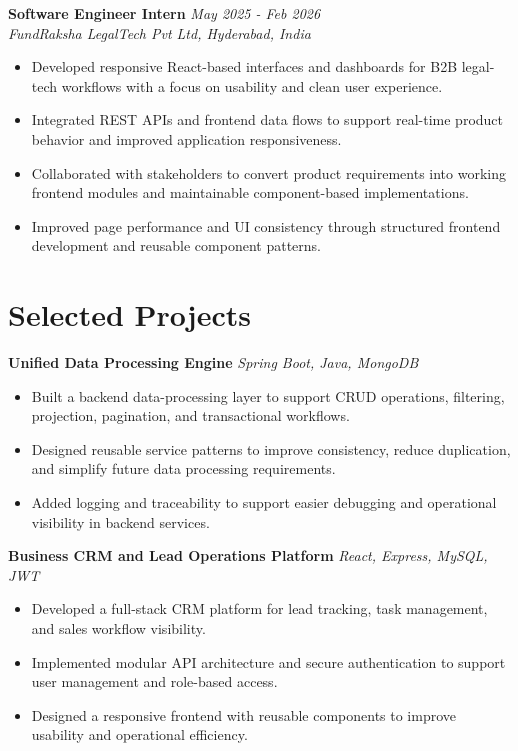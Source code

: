 \documentclass[10pt,a4paper]{article}
\begin{document}
\textbf{Software Engineer Intern} \hfill \textit{May 2025 - Feb 2026}\\
\textit{FundRaksha LegalTech Pvt Ltd, Hyderabad, India}\\
\begin{itemize}
  \item Developed responsive React-based interfaces and dashboards for B2B legal-tech workflows with a focus on usability and clean user experience.
  \item Integrated REST APIs and frontend data flows to support real-time product behavior and improved application responsiveness.
  \item Collaborated with stakeholders to convert product requirements into working frontend modules and maintainable component-based implementations.
  \item Improved page performance and UI consistency through structured frontend development and reusable component patterns.
\end{itemize}

\section*{\textcolor{accent}{Selected Projects}}

\textbf{Unified Data Processing Engine} \hfill \textit{Spring Boot, Java, MongoDB}\\
\begin{itemize}
  \item Built a backend data-processing layer to support CRUD operations, filtering, projection, pagination, and transactional workflows.
  \item Designed reusable service patterns to improve consistency, reduce duplication, and simplify future data processing requirements.
  \item Added logging and traceability to support easier debugging and operational visibility in backend services.
\end{itemize}

\textbf{Business CRM and Lead Operations Platform} \hfill \textit{React, Express, MySQL, JWT}\\
\begin{itemize}
  \item Developed a full-stack CRM platform for lead tracking, task management, and sales workflow visibility.
  \item Implemented modular API architecture and secure authentication to support user management and role-based access.
  \item Designed a responsive frontend with reusable components to improve usability and operational efficiency.
\end{itemize}
\end{document}
